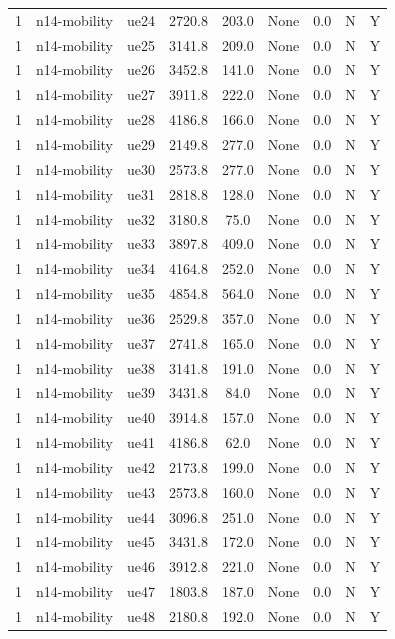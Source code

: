 \begin{table}[ht]
\begin{tabular}{|c|c|c|c|c|c|c|c|c|}
1 & n14-mobility & ue24 & 2720.8 & 203.0 & None & 0.0 & N & Y \\
1 & n14-mobility & ue25 & 3141.8 & 209.0 & None & 0.0 & N & Y \\
1 & n14-mobility & ue26 & 3452.8 & 141.0 & None & 0.0 & N & Y \\
1 & n14-mobility & ue27 & 3911.8 & 222.0 & None & 0.0 & N & Y \\
1 & n14-mobility & ue28 & 4186.8 & 166.0 & None & 0.0 & N & Y \\
1 & n14-mobility & ue29 & 2149.8 & 277.0 & None & 0.0 & N & Y \\
1 & n14-mobility & ue30 & 2573.8 & 277.0 & None & 0.0 & N & Y \\
1 & n14-mobility & ue31 & 2818.8 & 128.0 & None & 0.0 & N & Y \\
1 & n14-mobility & ue32 & 3180.8 & 75.0 & None & 0.0 & N & Y \\
1 & n14-mobility & ue33 & 3897.8 & 409.0 & None & 0.0 & N & Y \\
1 & n14-mobility & ue34 & 4164.8 & 252.0 & None & 0.0 & N & Y \\
1 & n14-mobility & ue35 & 4854.8 & 564.0 & None & 0.0 & N & Y \\
1 & n14-mobility & ue36 & 2529.8 & 357.0 & None & 0.0 & N & Y \\
1 & n14-mobility & ue37 & 2741.8 & 165.0 & None & 0.0 & N & Y \\
1 & n14-mobility & ue38 & 3141.8 & 191.0 & None & 0.0 & N & Y \\
1 & n14-mobility & ue39 & 3431.8 & 84.0 & None & 0.0 & N & Y \\
1 & n14-mobility & ue40 & 3914.8 & 157.0 & None & 0.0 & N & Y \\
1 & n14-mobility & ue41 & 4186.8 & 62.0 & None & 0.0 & N & Y \\
1 & n14-mobility & ue42 & 2173.8 & 199.0 & None & 0.0 & N & Y \\
1 & n14-mobility & ue43 & 2573.8 & 160.0 & None & 0.0 & N & Y \\
1 & n14-mobility & ue44 & 3096.8 & 251.0 & None & 0.0 & N & Y \\
1 & n14-mobility & ue45 & 3431.8 & 172.0 & None & 0.0 & N & Y \\
1 & n14-mobility & ue46 & 3912.8 & 221.0 & None & 0.0 & N & Y \\
1 & n14-mobility & ue47 & 1803.8 & 187.0 & None & 0.0 & N & Y \\
1 & n14-mobility & ue48 & 2180.8 & 192.0 & None & 0.0 & N & Y \\

\end{tabular}
\end{table}
